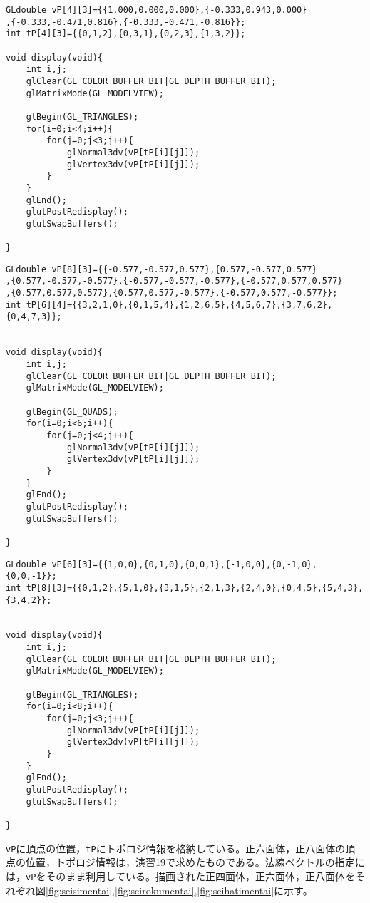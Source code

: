 \documentclass[]{jsarticle}
\begin{document}
\begin{lstlisting}[caption=正四面体を描画するプログラム(主要部),label=seisimentai]
GLdouble vP[4][3]={{1.000,0.000,0.000},{-0.333,0.943,0.000}
,{-0.333,-0.471,0.816},{-0.333,-0.471,-0.816}};
int tP[4][3]={{0,1,2},{0,3,1},{0,2,3},{1,3,2}};

void display(void){
	int i,j;
	glClear(GL_COLOR_BUFFER_BIT|GL_DEPTH_BUFFER_BIT);
	glMatrixMode(GL_MODELVIEW);

	glBegin(GL_TRIANGLES);
	for(i=0;i<4;i++){
		for(j=0;j<3;j++){
			glNormal3dv(vP[tP[i][j]]);
			glVertex3dv(vP[tP[i][j]]);
		}
	}
	glEnd();
	glutPostRedisplay();
	glutSwapBuffers();

}
\end{lstlisting}
\begin{lstlisting}[caption=正六面体を描画するプログラム(主要部),label=seirokumentai]
GLdouble vP[8][3]={{-0.577,-0.577,0.577},{0.577,-0.577,0.577}
,{0.577,-0.577,-0.577},{-0.577,-0.577,-0.577},{-0.577,0.577,0.577}
,{0.577,0.577,0.577},{0.577,0.577,-0.577},{-0.577,0.577,-0.577}};
int tP[6][4]={{3,2,1,0},{0,1,5,4},{1,2,6,5},{4,5,6,7},{3,7,6,2},{0,4,7,3}};


void display(void){
	int i,j;
	glClear(GL_COLOR_BUFFER_BIT|GL_DEPTH_BUFFER_BIT);
	glMatrixMode(GL_MODELVIEW);

	glBegin(GL_QUADS);
	for(i=0;i<6;i++){
		for(j=0;j<4;j++){
			glNormal3dv(vP[tP[i][j]]);
			glVertex3dv(vP[tP[i][j]]);
		}
	}
	glEnd();
	glutPostRedisplay();
	glutSwapBuffers();

}
\end{lstlisting}
\begin{lstlisting}[caption=正八面体を描画するプログラム(主要部),label=seihatimentai]
GLdouble vP[6][3]={{1,0,0},{0,1,0},{0,0,1},{-1,0,0},{0,-1,0},{0,0,-1}};
int tP[8][3]={{0,1,2},{5,1,0},{3,1,5},{2,1,3},{2,4,0},{0,4,5},{5,4,3},{3,4,2}};


void display(void){
	int i,j;
	glClear(GL_COLOR_BUFFER_BIT|GL_DEPTH_BUFFER_BIT);
	glMatrixMode(GL_MODELVIEW);

	glBegin(GL_TRIANGLES);
	for(i=0;i<8;i++){
		for(j=0;j<3;j++){
			glNormal3dv(vP[tP[i][j]]);
			glVertex3dv(vP[tP[i][j]]);
		}
	}
	glEnd();
	glutPostRedisplay();
	glutSwapBuffers();

}
\end{lstlisting}
\texttt{vP}に頂点の位置，\texttt{tP}にトポロジ情報を格納している。正六面体，正八面体の頂点の位置，トポロジ情報は，演習19で求めたものである。法線ベクトルの指定には，\texttt{vP}をそのまま利用している。描画された正四面体，正六面体，正八面体をそれぞれ図\ref{fig:seisimentai},\ref{fig:seirokumentai},\ref{fig:seihatimentai}に示す。
\end{document}
